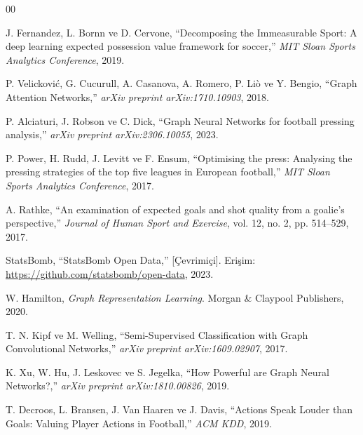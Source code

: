 \documentclass[conference]{IEEEtran}
\begin{document}
\begin{thebibliography}{00}

J. Fernandez, L. Bornn ve D. Cervone,
``Decomposing the Immeasurable Sport: A deep learning expected possession value
framework for soccer,''
\textit{MIT Sloan Sports Analytics Conference}, 2019.

P. Velicković, G. Cucurull, A. Casanova, A. Romero, P. Liò ve Y. Bengio,
``Graph Attention Networks,''
\textit{arXiv preprint arXiv:1710.10903}, 2018.

P. Alciaturi, J. Robson ve C. Dick,
``Graph Neural Networks for football pressing analysis,''
\textit{arXiv preprint arXiv:2306.10055}, 2023.

P. Power, H. Rudd, J. Levitt ve F. Ensum,
``Optimising the press: Analysing the pressing strategies of the top five leagues
in European football,''
\textit{MIT Sloan Sports Analytics Conference}, 2017.

A. Rathke,
``An examination of expected goals and shot quality from a goalie's perspective,''
\textit{Journal of Human Sport and Exercise}, vol. 12, no. 2, pp. 514--529, 2017.

StatsBomb,
``StatsBomb Open Data,''
[Çevrimiçi]. Erişim: \url{https://github.com/statsbomb/open-data}, 2023.

W. Hamilton,
\textit{Graph Representation Learning}.
Morgan \& Claypool Publishers, 2020.

T. N. Kipf ve M. Welling,
``Semi-Supervised Classification with Graph Convolutional Networks,''
\textit{arXiv preprint arXiv:1609.02907}, 2017.

K. Xu, W. Hu, J. Leskovec ve S. Jegelka,
``How Powerful are Graph Neural Networks?,''
\textit{arXiv preprint arXiv:1810.00826}, 2019.

T. Decroos, L. Bransen, J. Van Haaren ve J. Davis,
``Actions Speak Louder than Goals: Valuing Player Actions in Football,''
\textit{ACM KDD}, 2019.

\end{thebibliography}
\end{document}

